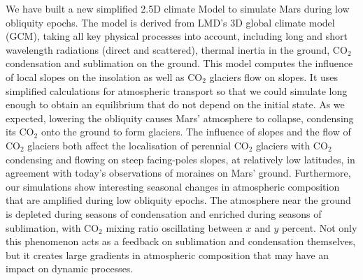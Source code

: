 
We have built a new simplified 2.5D climate Model to simulate Mars during low obliquity epochs.
The model is derived from LMD's 3D global climate model (GCM), taking all key physical processes
into account, including long and short wavelength radiations (direct and scattered), thermal inertia
in the ground, CO$_2$ condensation and sublimation on the ground. This model computes the influence
of local slopes on the insolation as well as CO$_2$ glaciers flow on slopes. It uses simplified 
calculations for atmospheric transport so that we could simulate long enough to obtain an equilibrium that 
do not depend on the initial state. As we expected, lowering the obliquity causes Mars' atmosphere to collapse,
condensing its CO$_2$ onto the ground to form glaciers.
The influence of slopes and the flow of CO$_2$ glaciers both affect the localisation of perennial CO$_2$ glaciers
with CO$_2$ condensing and flowing on steep facing-poles slopes, at relatively low latitudes, in agreement 
with today's observations of moraines on Mars' ground. \cite{Kres:11}
Furthermore, our simulations
show interesting seasonal changes in atmospheric composition that are amplified during low obliquity epochs.
The atmosphere near the ground is depleted during seasons of condensation and enriched during seasons of
sublimation, with CO$_2$ mixing ratio oscillating between $x$ and $y$ percent. Not only this phenomenon acts
as a feedback on sublimation and condensation themselves, but it creates large gradients in atmospheric composition
that may have an impact on dynamic processes.
